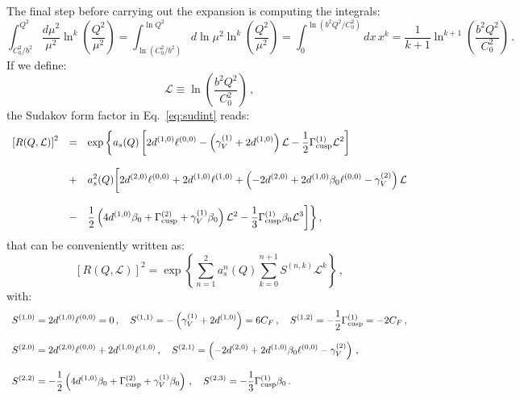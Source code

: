 \documentclass[10pt,a4paper]{article}
\begin{document}
The final step before carrying out the expansion is computing the
integrals:
\begin{equation}
\int_{C_0^2/b^2}^{Q^2}\frac{d\mu^2}{\mu^2}\ln^k\left(\frac{Q^2}{\mu^2}\right)
= \int_{\ln(C_0^2/b^2)}^{\ln
  Q^2}d\ln\mu^2\ln^k\left(\frac{Q^2}{\mu^2}\right) = \int^{\ln(b^2Q^2/C_0^2)}_{0}dx\,x^k=\frac{1}{k+1}\ln^{k+1}\left(\frac{b^2Q^2}{C_0^2}\right)\,.
\end{equation}
If we define:
\begin{equation}
\mathcal{L}\equiv \ln\left(\frac{b^2Q^2}{C_0^2}\right)\,,
\end{equation}
the Sudakov form factor in Eq.~\ref{eq:sudint} reads:
\begin{equation}
\begin{array}{rcl}
  \displaystyle \left[R(Q,\mathcal{L})\right]^2&=&\displaystyle \exp\bigg\{a_s(Q)\left[2d^{(1,0)}\ell^{(0,0)}-\left(\gamma_V^{(1)}+2d^{(1,0)}\right)\mathcal{L}-\frac{1}{2}\Gamma_{\rm
                                         cusp}^{(1)}\mathcal{L}^2\right]\\
  \\
                                     &+&\displaystyle a_s^2(Q) \bigg[2d^{(2,0)}\ell^{(0,0)} +
                                         2d^{(1,0)}\ell^{(1,0)}+\left(-2d^{(2,0)}+2d^{(1,0)}\beta_0
                                         \ell^{(0,0)}-\gamma_V^{(2)}\right)\mathcal{L}\\
  \\
                                     &-&\displaystyle \frac12\left(4d^{(1,0)}\beta_0+\Gamma_{\rm
                                         cusp}^{(2)}+\gamma_V^{(1)}\beta_0 \right) \mathcal{L}^2-\frac13\Gamma_{\rm
                                         cusp}^{(1)}\beta_0 \mathcal{L}^3\bigg]\bigg\}\,,
\end{array}
\end{equation}
that can be conveniently written as:
\begin{equation}\label{eq:SudCompact}
  \displaystyle \left[R(Q,\mathcal{L})\right]^2=\exp\left\{\sum_{n=1}^2a_s^n(Q)\sum_{k=0}^{n+1}S^{(n,k)}\mathcal{L}^k\right\}\,,
\end{equation}
with:
\begin{equation}
\begin{array}{l}
\displaystyle S^{(1,0)} =
  2d^{(1,0)}\ell^{(0,0)}=0\,,\quad\displaystyle S^{(1,1)} =
  -\left(\gamma_V^{(1)}+2d^{(1,0)}\right)=6 C_F\,,\quad\displaystyle
                                                   S^{(1,2)} =
  -\frac{1}{2}\Gamma_{\rm cusp}^{(1)}= -2C_F\,,\\
\\
\displaystyle S^{(2,0)} = 2d^{(2,0)}\ell^{(0,0)} +
  2d^{(1,0)}\ell^{(1,0)}\,,\quad\displaystyle S^{(2,1)} =
                           \left(-2d^{(2,0)}+2d^{(1,0)}\beta_0
  \ell^{(0,0)}-\gamma_V^{(2)}\right)\,,\\
\\
\displaystyle S^{(2,2)} = -\frac12\left(4d^{(1,0)}\beta_0+\Gamma_{\rm cusp}^{(2)}+\gamma_V^{(1)}\beta_0 \right)\,,\quad\displaystyle S^{(2,3)} = -\frac13\Gamma_{\rm cusp}^{(1)}\beta_0\,.
\end{array}
\end{equation}
\end{document}
